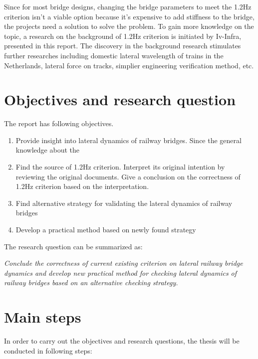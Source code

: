 Since for most bridge designs, changing the bridge parameters to meet the 1.2Hz criterion isn't a viable option because it's expensive to add stiffness to the bridge, the projects need a solution to solve the problem. To gain more knowledge on the topic, a research on the background of 1.2Hz criterion is initiated by Iv-Infra, presented in this report. The discovery in the background research stimulates further researches including domestic lateral wavelength of trains in the Netherlands, lateral force on tracks, simplier engineering verification method, etc. 

\section{Objectives and research question}\label{sec:introduction}


The report has following objectives.

\begin{enumerate}[-]
\item Provide insight into lateral dynamics of railway bridges. Since the general knowledge about the 


\item Find the source of 1.2Hz criterion. Interpret its original intention by reviewing the original documents. Give a conclusion on the correctness of 1.2Hz criterion based on the interpretation.
\item Find alternative strategy for validating the lateral dynamics of railway bridges
\item Develop a practical method based on newly found strategy 
\end{enumerate}

\vspace*{0.5cm}

The research question can be summarized as:

\vspace*{0.5cm}

\textit{Conclude the correctness of current existing criterion on lateral railway bridge dynamics and develop new practical method for checking lateral dynamics of railway bridges based on an alternative checking strategy. }


\section{Main steps}

In order to carry out the objectives and research questions, the thesis will be conducted in following steps:


